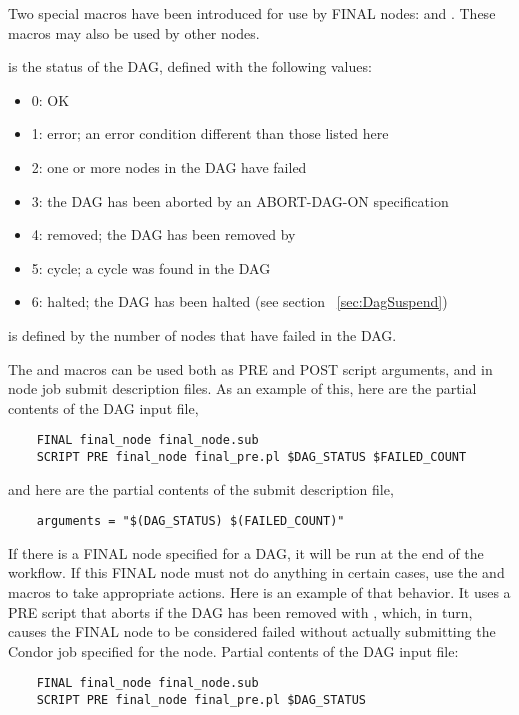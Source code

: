 Two special macros have been introduced for use by FINAL nodes:
 and .
These macros may also be used by other nodes.

 is the status of the DAG,
defined with the following values:
\begin{itemize}
\item 0: OK
\item 1: error; an error condition different than those listed here
\item 2: one or more nodes in the DAG have failed
\item 3: the DAG has been aborted by an ABORT-DAG-ON specification
\item 4: removed; the DAG has been removed by 
\item 5: cycle; a cycle was found in the DAG
\item 6: halted; the DAG has been halted (see section ~\ref{sec:DagSuspend})
\end{itemize}

 is defined by the number of nodes that have failed in the
DAG.

The  and  macros can be used both
as PRE and POST script arguments, and in node job submit description files.
As an example of this, here are the partial contents of the DAG input file,
\begin{verbatim}
    FINAL final_node final_node.sub
    SCRIPT PRE final_node final_pre.pl $DAG_STATUS $FAILED_COUNT
\end{verbatim}

and here are the partial contents of the submit description file, 
\begin{verbatim}
    arguments = "$(DAG_STATUS) $(FAILED_COUNT)"
\end{verbatim}

If there is a FINAL node specified for a DAG, 
it will be run at the end of the workflow.
If this FINAL node must not do anything in certain cases, 
use the  and 
macros to take appropriate actions.  
Here is an example of that behavior.
It uses a PRE script that aborts if the DAG has been removed with ,
which, in turn,
causes the FINAL node to be considered failed without actually submitting the
Condor job specified for the node.
Partial contents of the DAG input file:
\begin{verbatim}
    FINAL final_node final_node.sub
    SCRIPT PRE final_node final_pre.pl $DAG_STATUS
\end{verbatim}

